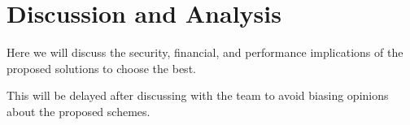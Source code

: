 \section{Discussion and Analysis}
\label{analysis}
Here we will discuss the security, financial, and performance implications of the 
proposed solutions to choose the best.


This will be delayed after discussing with the team to avoid biasing opinions 
about the proposed schemes.
